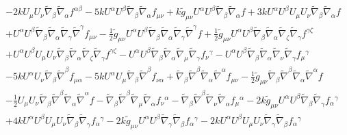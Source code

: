 \documentclass[10pt,letterpaper]{article}
\numberwithin{equation}{section}
\begin{document}
\begin{eqnarray}
&& - 2 k U_{\mu } U_{\nu } \tilde{\nabla}_{\beta }\tilde{\nabla}_{\alpha }f^{\alpha \beta } - 5 k U^{\alpha } U^{\beta } \tilde{\nabla}_{\beta }\tilde{\nabla}_{\alpha }f_{\mu \nu } + k \tilde{g}_{\mu \nu } U^{\alpha } U^{\beta } \tilde{\nabla}_{\beta }\tilde{\nabla}_{\alpha }f + 3 k U^{\alpha } U^{\beta } U_{\mu } U_{\nu } \tilde{\nabla}_{\beta }\tilde{\nabla}_{\alpha }f \nonumber \\ 
&& + U^{\alpha } U^{\beta } \tilde{\nabla}_{\beta }\tilde{\nabla}_{\alpha }\tilde{\nabla}_{\gamma }\tilde{\nabla}^{\gamma }f_{\mu \nu } -  \tfrac{1}{2} \tilde{g}_{\mu \nu } U^{\alpha } U^{\beta } \tilde{\nabla}_{\beta }\tilde{\nabla}_{\alpha }\tilde{\nabla}_{\gamma }\tilde{\nabla}^{\gamma }f + \tfrac{1}{2} \tilde{g}_{\mu \nu } U^{\alpha } U^{\beta } \tilde{\nabla}_{\beta }\tilde{\nabla}_{\alpha }\tilde{\nabla}_{\zeta }\tilde{\nabla}_{\gamma }f^{\gamma \zeta } \nonumber \\ 
&& + U^{\alpha } U^{\beta } U_{\mu } U_{\nu } \tilde{\nabla}_{\beta }\tilde{\nabla}_{\alpha }\tilde{\nabla}_{\zeta }\tilde{\nabla}_{\gamma }f^{\gamma \zeta } -  U^{\alpha } U^{\beta } \tilde{\nabla}_{\beta }\tilde{\nabla}_{\alpha }\tilde{\nabla}_{\mu }\tilde{\nabla}_{\gamma }f_{\nu }{}^{\gamma } -  U^{\alpha } U^{\beta } \tilde{\nabla}_{\beta }\tilde{\nabla}_{\alpha }\tilde{\nabla}_{\nu }\tilde{\nabla}_{\gamma }f_{\mu }{}^{\gamma } \nonumber \\ 
&& - 5 k U^{\alpha } U_{\nu } \tilde{\nabla}_{\beta }\tilde{\nabla}^{\beta }f_{\mu \alpha } - 5 k U^{\alpha } U_{\mu } \tilde{\nabla}_{\beta }\tilde{\nabla}^{\beta }f_{\nu \alpha } + \tilde{\nabla}_{\beta }\tilde{\nabla}^{\beta }\tilde{\nabla}_{\alpha }\tilde{\nabla}^{\alpha }f_{\mu \nu } -  \tfrac{1}{2} \tilde{g}_{\mu \nu } \tilde{\nabla}_{\beta }\tilde{\nabla}^{\beta }\tilde{\nabla}_{\alpha }\tilde{\nabla}^{\alpha }f \nonumber \\ 
&& -  \tfrac{1}{2} U_{\mu } U_{\nu } \tilde{\nabla}_{\beta }\tilde{\nabla}^{\beta }\tilde{\nabla}_{\alpha }\tilde{\nabla}^{\alpha }f -  \tilde{\nabla}_{\beta }\tilde{\nabla}^{\beta }\tilde{\nabla}_{\mu }\tilde{\nabla}_{\alpha }f_{\nu }{}^{\alpha } -  \tilde{\nabla}_{\beta }\tilde{\nabla}^{\beta }\tilde{\nabla}_{\nu }\tilde{\nabla}_{\alpha }f_{\mu }{}^{\alpha } - 2 k \tilde{g}_{\mu \nu } U^{\alpha } U^{\beta } \tilde{\nabla}_{\beta }\tilde{\nabla}_{\gamma }f_{\alpha }{}^{\gamma } \nonumber \\ 
&& + 4 k U^{\alpha } U^{\beta } U_{\mu } U_{\nu } \tilde{\nabla}_{\beta }\tilde{\nabla}_{\gamma }f_{\alpha }{}^{\gamma } - 2 k \tilde{g}_{\mu \nu } U^{\alpha } U^{\beta } \tilde{\nabla}_{\gamma }\tilde{\nabla}_{\beta }f_{\alpha }{}^{\gamma } - 2 k U^{\alpha } U^{\beta } U_{\mu } U_{\nu } \tilde{\nabla}_{\gamma }\tilde{\nabla}_{\beta }f_{\alpha }{}^{\gamma } \nonumber \\ 

\end{eqnarray}
\end{document}
